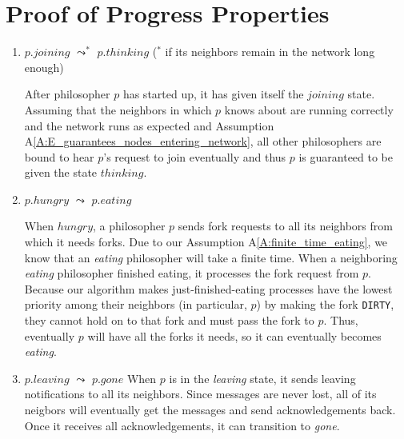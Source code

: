 \documentclass[11pt]{article}
\begin{document}
\section{Proof of Progress Properties}
\begin{enumerate}[PG1]
\item
$p.joining$ $\leadsto^*$ $p.thinking$ ($^*$ if its neighbors remain in the network long enough) 

\indent After philosopher $p$ has started up, it has given itself the $joining$ state. Assuming that the neighbors in which $p$ knows about are running correctly and the network runs as expected and Assumption A\ref{A:E_guarantees_nodes_entering_network}, all other philosophers are bound to hear $p$'s request to join eventually and thus $p$ is guaranteed to be given the state $thinking$.

\item  $p.hungry$ $\leadsto$ $p.eating$

\indent When $hungry$, a philosopher $p$ sends fork requests to all its neighbors from which it needs forks. Due to our Assumption A\ref{A:finite_time_eating}, we know that an \emph{eating} philosopher will take a finite time. When a neighboring \emph{eating} philosopher finished eating, it processes the fork request from $p$. Because our algorithm makes just-finished-eating processes have the lowest priority among their neighbors (in particular, $p$) by making the fork \texttt{DIRTY}, they cannot hold on to that fork and must pass the fork to $p$. Thus, eventually $p$ will have all the forks it needs, so it can eventually becomes \emph{eating}.


\item 
$p.leaving$ $\leadsto$ $p.gone$
When $p$ is in the \emph{leaving} state, it sends leaving notifications to all its neighbors. Since messages are never lost, all of its neigbors will eventually get the messages and send acknowledgements back. Once it receives all acknowledgements, it can transition to \emph{gone}.

\end{enumerate}
\end{document}
